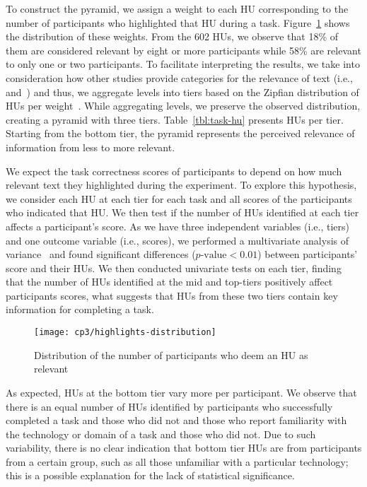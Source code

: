 To construct the pyramid, we assign a weight to each HU
corresponding to the number of participants who highlighted that HU during
a task.
Figure~\ref{fig:highlights-distribution} shows the distribution of these weights.
From the 602 HUs, we observe that 18\% of them are considered relevant by eight or more participants while 58\% are relevant to only one or two participants.
To facilitate interpreting the results,
we take into consideration how other studies provide categories for the relevance of
text (i.e.,~\cite{Petrosyan2015} and~\cite{Jiang2017}) and thus,
we aggregate levels into tiers based on the Zipfian distribution of HUs per weight~\cite{Nenkova2004}.
While aggregating levels, we preserve the observed distribution, creating a pyramid with three tiers.
Table~\ref{tbl:task-hu} presents HUs per tier.
Starting from the bottom tier, the pyramid represents the perceived relevance of information from less to more relevant.




We expect the task correctness scores of participants
to depend on how much relevant text they highlighted during the experiment.
To explore this hypothesis, we consider each HU at each tier for each task
and all scores of the participants who indicated that HU.
We then test if the number of HUs identified at each tier affects a participant's score.
As we have three independent variables (i.e., tiers) and one outcome variable (i.e., scores), we performed a multivariate analysis of variance~\cite{wohlin2012} and found significant differences ($p\text{-value} < 0.01$) between participants' score and their HUs.
We then conducted univariate tests on each tier,
finding that 
the number of HUs identified at the mid and top-tiers 
positively affect participants scores, 
what suggests that HUs from these two tiers contain key
information for completing a task.





\begin{figure}
    \centering
    \texttt{[image: cp3/highlights-distribution]}
    \caption{Distribution of the number of participants who deem an HU as relevant}
    \label{fig:highlights-distribution}
\end{figure}




As expected, HUs at the bottom tier vary more per participant.
We observe that there is an equal number of HUs identified by participants who successfully
completed a task and those who did not and those who report familiarity with
the technology or domain of a task and those who did not.
Due to such variability, there is no clear indication
that bottom tier HUs are from participants from a certain group, such as all those
unfamiliar with a particular technology; this is a possible explanation for the lack
of statistical significance.




